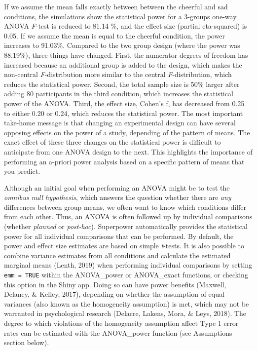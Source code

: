 \documentclass[
  ,man,floatsintext]{apa6}
\begin{document}
If we assume the mean falls exactly between between the cheerful and sad conditions, the simulations show the statistical power for a 3-groups one-way ANOVA \emph{F}-test is reduced to 81.14 \%, and the effect size (partial eta-squared) is 0.05.
If we assume the mean is equal to the cheerful condition, the power increases to 91.03\%.
Compared to the two group design (where the power was 88.19\%), three things have changed.
First, the numerator degrees of freedom has increased because an additional group is added to the design, which makes the non-central \emph{F}-distribution more similar to the central \emph{F}-distribution, which reduces the statistical power.
Second, the total sample size is 50\% larger after adding 80 participants in the third condition, which increases the statistical power of the ANOVA.
Third, the effect size, Cohen's f, has decreased from 0.25 to either 0.20 or 0.24, which reduces the statistical power.
The most important take-home message is that changing an experimental design can have several opposing effects on the power of a study, depending of the pattern of means.
The exact effect of these three changes on the statistical power is difficult to anticipate from one ANOVA design to the next.
This highlights the importance of performing an a-priori power analysis based on a specific pattern of means that you predict.

Although an initial goal when performing an ANOVA might be to test the \emph{omnibus null hypothesis}, which answers the question whether there are \emph{any} differences between group means, we often want to know which conditions differ from each other.
Thus, an ANOVA is often followed up by individual comparisons (whether \emph{planned} or \emph{post-hoc}).
Superpower automatically provides the statistical power for all individual comparisons that can be performed.
By default, the power and effect size estimates are based on simple \emph{t}-tests.
It is also possible to combine variance estimates from all conditions and calculate the estimated marginal means (Lenth, 2019) when performing individual comparisons by setting \texttt{emm\ =\ TRUE} within the ANOVA\_power or ANOVA\_exact functions, or checking this option in the Shiny app.
Doing so can have power benefits (Maxwell, Delaney, \& Kelley, 2017), depending on whether the assumption of equal variances (also known as the homogeneity assumption) is met, which may not be warranted in psychological research (Delacre, Lakens, Mora, \& Leys, 2018).
The degree to which violations of the homogeneity assumption affect Type 1 error rates can be estimated with the ANOVA\_power function (see Assumptions section below).
\end{document}
